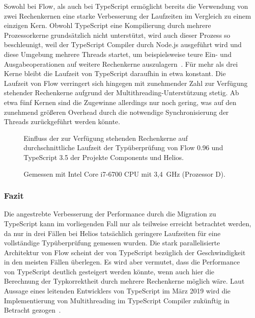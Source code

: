 Sowohl bei Flow, als auch bei TypeScript ermöglicht bereits die Verwendung von zwei Rechenkernen eine starke Verbesserung der Laufzeiten im Vergleich zu einem einzigen Kern. Obwohl TypeScript eine Kompilierung durch mehrere Prozessorkerne grundsätzlich nicht unterstützt, wird auch dieser Prozess so beschleunigt, weil der TypeScript Compiler durch Node.js ausgeführt wird und diese Umgebung mehrere Threads startet, um beispielsweise teure Ein- und Ausgabeoperationen auf weitere Rechenkerne auszulagern~\autocite{NODE:THREADS}. Für mehr als drei Kerne bleibt die Laufzeit von TypeScript daraufhin in etwa konstant. Die Laufzeit von Flow verringert sich hingegen mit zunehmender Zahl zur Verfügung stehender Rechenkerne aufgrund der Multithreading-Unterstützung stetig. Ab etwa fünf Kernen sind die Zugewinne allerdings nur noch gering, was auf den zunehmend größeren Overhead durch die notwendige Synchronisierung der Threads zurückgeführt werden könnte.

\begin{figure}[tbp]
  \centering

  

  \vspace{.5\baselineskip}

  
  \vspace{.5\baselineskip}
  \caption[Einfluss der zur Verfügung stehenden Rechenkerne auf durchschnittliche Laufzeit der Typüberprüfung von Flow und TypeScript]{
    Einfluss der zur Verfügung stehenden Rechenkerne auf durchschnittliche Laufzeit der Typüberprüfung von Flow 0.96 und TypeScript 3.5 der Projekte Components und Helios.
  }

  \vspace{\baselineskip}
  \caption*{
    \small
    Gemessen mit Intel Core i7-6700 CPU mit 3,4~GHz (Prozessor D).
  }

  \label{fig:plot-cores}
\end{figure}

\medbreak


\subsubsection{Fazit}

Die angestrebte Verbesserung der Performance durch die Migration zu TypeScript kann im vorliegenden Fall nur als teilweise erreicht betrachtet werden, da nur in drei Fällen bei Helios tatsächlich geringere Laufzeiten für eine vollständige Typüberprüfung gemessen wurden. Die stark parallelisierte Architektur von Flow scheint der von TypeScript bezüglich der Geschwindigkeit in den meisten Fällen überlegen. Es wird aber vermutet, dass die Performance von TypeScript deutlich gesteigert werden könnte, wenn auch hier die Berechnung der Typkorrektheit durch mehrere Rechenkerne möglich wäre. Laut Aussage eines leitenden Entwicklers von TypeScript im März 2019 wird die Implementierung von Multithreading im TypeScript Compiler zukünftig in Betracht gezogen~\autocite{TS:MULTICORE}.

